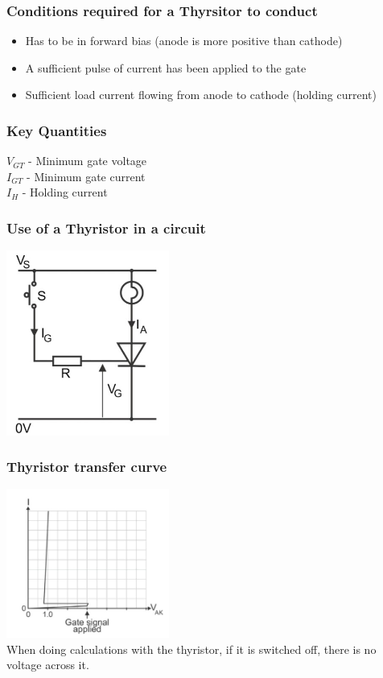\documentclass[a4paper, 11pt, twocolumn]{article}
\begin{document}
    \subsubsection{Conditions required for a Thyrsitor to conduct}
    \begin{itemize}
        \item Has to be in forward bias (anode is more positive than cathode)
        \item A sufficient pulse of current has been applied to the gate
        \item Sufficient load current flowing from anode to cathode (holding current)
    \end{itemize}
    \subsubsection{Key Quantities}
    $V_{GT}$ - Minimum gate voltage\\
    $I_{GT}$ - Minimum gate current\\
    $I_H$ - Holding current
    \subsubsection{Use of a Thyristor in a circuit}
    \includegraphics[width=0.4\textwidth]{thyristorCircuit1.jpg}
    \subsubsection{Thyristor transfer curve}
    \includegraphics[width=0.4\textwidth]{thyristorGraph.jpg}\\
    When doing calculations with the thyristor, if it is switched off, there is no voltage across it.
\end{document}
